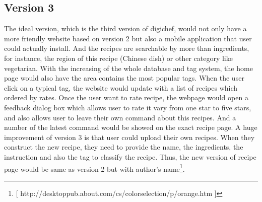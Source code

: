 \documentclass[12pt]{article}
\begin{document}
\subsection{Version 3}
The ideal version, which is the third version of digichef, would not only have a more friendly website based on version 2 but also a mobile application that user could actually install. And the recipes are searchable by more than ingredients, for instance, the region of this recipe (Chinese dish) or other category like vegetarian. 
With the increasing of the whole database and tag system, the home page would also have the area contains the most popular tags. When the user click on a typical tag, the website would update with a list of recipes which ordered by rates. 
Once the user want to rate recipe, the webpage would open a feedback dialog box which allows user to rate it vary from one star to five stars, and also allows user to leave their own command about this recipes. And a number of the latest command would be showed on the exact recipe page. 
A huge improvement of version 3 is that user could upload their own recipes. When they construct the new recipe, they need to provide the name, the ingredients, the instruction and also the tag to classify the recipe. Thus, the new version of recipe page would be same as version 2 but with author’s name\footnote{[ http://desktoppub.about.com/cs/colorselection/p/orange.htm ]}. 
\end{document}
